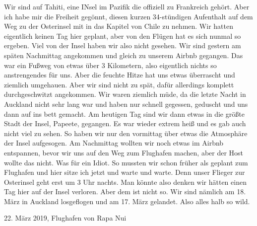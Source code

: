 \documentclass[11pt]{book}
\begin{document}
Wir sind auf Tahiti, eine INsel im Pazifik die offiziell zu Frankreich gehört. Aber ich habe mir die Freiheit gegönnt, diesen 
kurzen 34-stündigen Aufenthalt auf dem Weg zu der Osterinsel mit in das Kapitel von Chile zu nehmen. Wir hatten eigentlich keinen 
Tag hier geplant, aber von den Flügen hat es sich nunmal so ergeben. Viel von der Insel haben wir also nicht gesehen. Wir sind gestern 
am späten Nachmittag angekommen und gleich zu unserem Airbnb gegangen. Das war ein Fußweg von etwas über 3 Kilometern, also eigentlich 
nichts so anstrengendes für uns. Aber die feuchte Hitze hat uns etwas überrascht und ziemlich umgehauen. Aber wir sind nicht zu 
spät, dafür allerdings komplett durchgeschwitzt angekommen. Wir waren ziemlich müde, da die letzte Nacht in Auckland nicht sehr 
lang war und haben nur schnell gegessen, geduscht und uns dann auf ins bett gemacht. Am heutigen Tag sind wir dann etwas in die 
größte Stadt der Insel, Papeete, gegangen. Es war wieder extrem heiß und es gab auch nicht viel zu sehen. So haben wir nur den 
vormittag über etwas die Atmosphäre der Insel aufgesogen. Am Nachmittag wollten wir noch etwas im Airbnb entspannen, bevor wir uns 
auf den Weg zum Flughafen machen, aber der Host wollte das nicht. Was für ein Idiot. So mussten wir schon früher als geplant zum 
Flughafen und hier sitze ich jetzt und warte und warte. Denn unser Flieger zur Osterinsel geht erst um 3 Uhr nachts. Man könnte also 
denken wir hätten einen Tag hier auf der Insel verloren. Aber dem ist nicht so. Wir sind nämlich am 18. März in Auckland losgeflogen 
und am 17. März gelandet. Also alles halb so wild.


22. März 2019, Flughafen von Rapa Nui 
\end{document}
